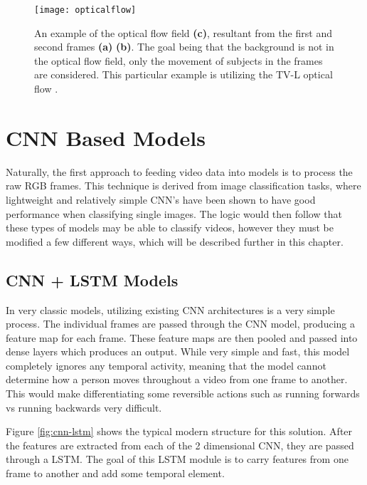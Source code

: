 \begin{figure}[ht]
	\texttt{[image: opticalflow]}
	\centering
	\caption{An example of the optical flow field \textbf{(c)}, resultant from the first and second frames \textbf{(a)} \textbf{(b)}. The goal being that the background is not in the optical flow field, only the movement of subjects in the frames are considered. This particular example is utilizing the TV-L optical flow \cite{TV-L}.}
	\label{fig:opticalflow}
\end{figure}


\section{CNN Based Models}

Naturally, the first approach to feeding video data into models is to process the raw RGB frames. This technique is derived from image classification tasks, where lightweight and relatively simple CNN's have been shown to have good performance when classifying single images. The logic would then follow that these types of models may be able to classify videos, however they must be modified a few different ways, which will be described further in this chapter.

\subsection{CNN + LSTM Models}

In very classic models, utilizing existing CNN architectures is a very simple process. The individual frames are passed through the CNN model, producing a feature map for each frame. These feature maps are then pooled and passed into dense layers which produces an output. While very simple and fast, this model completely ignores any temporal activity, meaning that the model cannot determine how a person moves throughout a video from one frame to another. This would make differentiating some reversible actions such as running forwards vs running backwards very difficult.

Figure \ref{fig:cnn-lstm} shows the typical modern structure for this solution. After the features are extracted from each of the 2 dimensional CNN, they are passed through a LSTM. The goal of this LSTM module is to carry features from one frame to another and add some temporal element.

